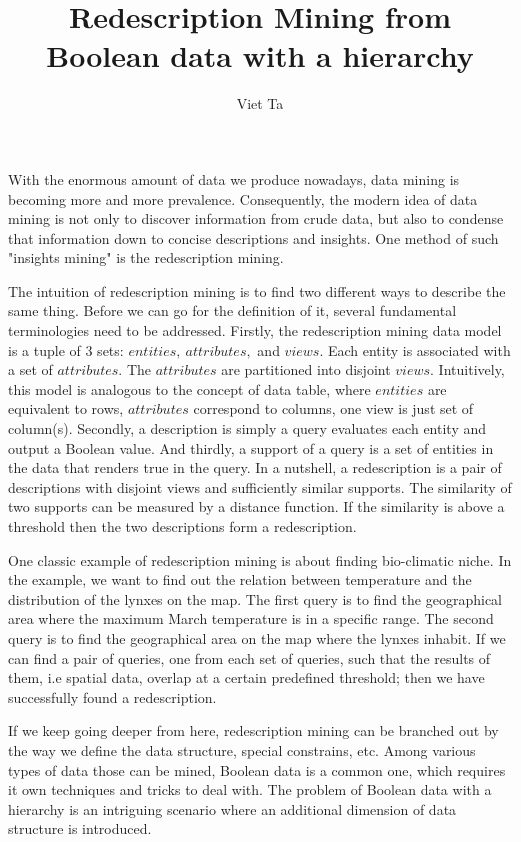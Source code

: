 \documentclass[12pt,a4paper,draft]{article}
\author{Viet Ta}
\title{Redescription Mining from Boolean data with a hierarchy}
\begin{document}
\maketitle

With the enormous amount of data we produce nowadays, data mining is becoming more and more prevalence. Consequently, the modern idea of data mining is not only to discover information from crude data, but also to condense that information down to concise descriptions and insights. One method of such "insights mining" is the redescription mining.

The intuition of redescription mining is to find two different ways to describe the same thing. Before we can go for the definition of it, several fundamental terminologies need to be addressed.
Firstly, the redescription mining data model is a tuple of 3 sets: $entities,\ attributes,$ and $views$. Each entity is associated with a set of $attributes$. The $attributes$ are partitioned into disjoint $views$. Intuitively, this model is analogous to the concept of data table, where $entities$ are equivalent to rows, $attributes$ correspond to columns, one view is just set of column(s). Secondly, a description is simply a query evaluates each entity and output a Boolean value. And thirdly, a support of a query is a set of entities in the data that renders true in the query.
In a nutshell, a redescription is a pair of descriptions with disjoint views and sufficiently similar supports. %
The similarity of two supports can be measured by a distance function. If the similarity is above a threshold then the two descriptions form a redescription.

One classic example of redescription mining is about finding bio-climatic niche. In the example, we want to find out the relation between temperature and the distribution of the lynxes on the map. The first query is to find the geographical area where the maximum March temperature is in a specific range. The second query is to find the geographical area on the map where the lynxes inhabit. If we can find a pair of queries, one from each set of queries, such that the results of them, i.e spatial data, overlap at a certain predefined threshold; then we have successfully found a redescription.


If we keep going deeper from here, redescription mining can be branched out by the way we define the data structure, special constrains, etc. Among various types of data those can be mined, Boolean data is a common one, which requires it own techniques and tricks to deal with.
The problem of Boolean data with a hierarchy is an intriguing scenario where an additional dimension of data structure is introduced.
\end{document}
